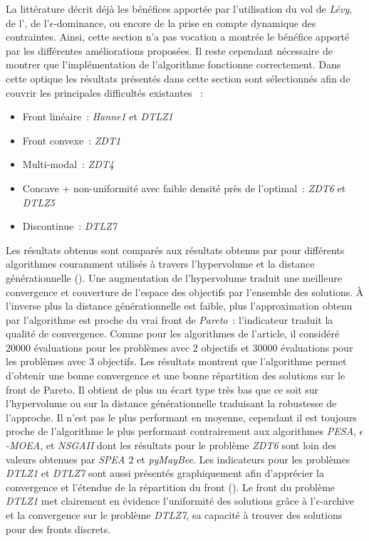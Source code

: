 La littérature décrit déjà les bénéfices apportée par l’utilisation du vol de
\textit{Lévy}, de l’, de l’$\epsilon$-dominance, ou encore de la prise en compte
dynamique des contraintes. Ainsi, cette section n’a pas vocation a montrée le bénéfice
apporté par les différentes améliorations proposées. Il reste cependant nécessaire de
montrer que l’implémentation de l’algorithme  fonctionne correctement. Dans cette
optique les résultats présentés dans cette section sont sélectionnés afin de couvrir les
principales difficultés existantes \parencite{Collette2002,Deb2002825}~:
\begin{itemize}
    \item Front linéaire~: \textit{Hanne1} et \textit{DTLZ1}
    \item Front convexe~: \textit{ZDT1}
    \item Multi-modal~: \textit{ZDT4}
    \item Concave + non-uniformité avec faible densité près de l’optimal~: \textit{ZDT6} et \textit{DTLZ5}
    \item Discontinue~: \textit{DTLZ7}
\end{itemize}

Les résultats obtenus sont comparés aux résultats obtenus par \textcite{Deb2005501}
pour différents algorithmes couramment utilisés à travers l’hypervolume et la
distance générationnelle (). Une augmentation de l’hypervolume
traduit une meilleure convergence et couverture de l’espace des objectifs par l’ensemble des solutions.
À l’inverse plus la distance générationnelle est faible, plus l’approximation obtenu par l’algorithme
est proche du vrai front de \textit{Pareto}~: l’indicateur traduit la qualité de convergence.
Comme pour les algorithmes de l’article, il considéré \num{20000} évaluations pour les problèmes avec $2$
objectifs et \num{30000} évaluations pour les problèmes avec $3$ objectifs.
Les résultats montrent que l’algorithme permet d’obtenir une bonne convergence et une bonne
répartition des solutions sur le front de Pareto. Il obtient de plus un écart type très bas
que ce soit sur l’hypervolume ou sur la distance générationnelle traduisant la robustesse de
l’approche. Il n’est pas le plus performant en moyenne, cependant il est toujours proche de l’algorithme le plus
performant contrairement aux algorithmes \textit{PESA}, \textit{$\epsilon$-MOEA}, et \textit{NSGAII} dont les
résultats pour le problème \textit{ZDT6} sont loin des valeurs obtenues par \textit{SPEA $2$} et
\textit{pyMayBee}.
Les indicateurs pour les problèmes \textit{DTLZ1} et \textit{DTLZ7} sont aussi
présentés graphiquement afin d’apprécier la convergence et l’étendue de la répartition du front
(). Le front du problème \textit{DTLZ1} met
clairement en évidence l’uniformité des solutions grâce à l’$\epsilon$-archive et la
convergence sur le problème \textit{DTLZ7}, sa capacité à trouver des solutions pour des fronts discrets.

